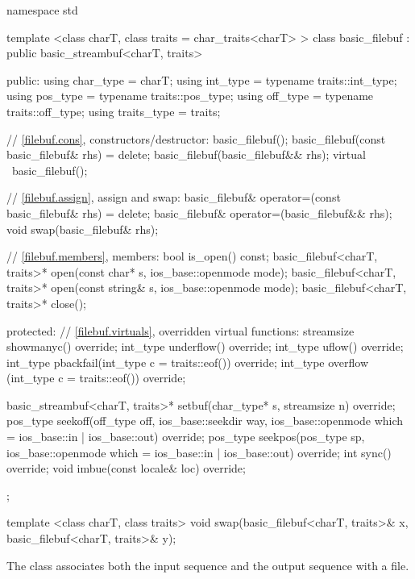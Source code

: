 %
\begin{codeblock}
namespace std {
  template <class charT, class traits = char_traits<charT> >
  class basic_filebuf
    : public basic_streambuf<charT, traits> {
  public:
    using char_type   = charT;
    using int_type    = typename traits::int_type;
    using pos_type    = typename traits::pos_type;
    using off_type    = typename traits::off_type;
    using traits_type = traits;

    // \ref{filebuf.cons}, constructors/destructor:
    basic_filebuf();
    basic_filebuf(const basic_filebuf& rhs) = delete;
    basic_filebuf(basic_filebuf&& rhs);
    virtual ~basic_filebuf();

    // \ref{filebuf.assign}, assign and swap:
    basic_filebuf& operator=(const basic_filebuf& rhs) = delete;
    basic_filebuf& operator=(basic_filebuf&& rhs);
    void swap(basic_filebuf& rhs);

    // \ref{filebuf.members}, members:
    bool is_open() const;
    basic_filebuf<charT, traits>* open(const char* s,
                                       ios_base::openmode mode);
    basic_filebuf<charT, traits>* open(const string& s,
                                       ios_base::openmode mode);
    basic_filebuf<charT, traits>* close();

  protected:
    // \ref{filebuf.virtuals}, overridden virtual functions:
    streamsize showmanyc() override;
    int_type underflow() override;
    int_type uflow() override;
    int_type pbackfail(int_type c = traits::eof()) override;
    int_type overflow (int_type c = traits::eof()) override;

    basic_streambuf<charT, traits>* setbuf(char_type* s,
                                           streamsize n) override;
    pos_type seekoff(off_type off, ios_base::seekdir way,
                     ios_base::openmode which
                      = ios_base::in | ios_base::out) override;
    pos_type seekpos(pos_type sp,
                     ios_base::openmode which
                      = ios_base::in | ios_base::out) override;
    int      sync() override;
    void     imbue(const locale& loc) override;
  };

  template <class charT, class traits>
    void swap(basic_filebuf<charT, traits>& x,
              basic_filebuf<charT, traits>& y);
}
\end{codeblock}

\pnum
The class
associates both the input sequence and the output
sequence with a file.

